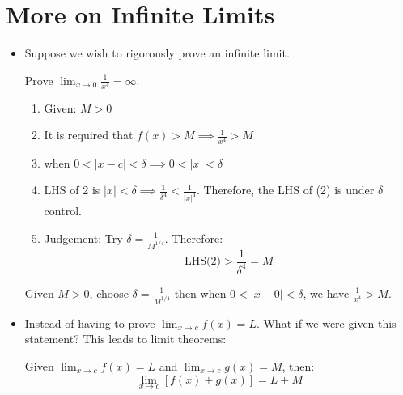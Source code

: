 \section{More on Infinite Limits}
\begin{itemize}
    \item Suppose we wish to rigorously prove an infinite limit.
    \begin{example}
        Prove $\displaystyle\lim_{x\to 0}\frac{1}{x^4}=\infty$.
        \begin{enumerate}
            \item Given: $M>0$
            \item It is required that $f(x)>M \implies \frac{1}{x^4} > M$
            \item when $0<|x-c|<\delta \implies 0<|x|<\delta$
            \item LHS of 2 is $|x|<\delta \implies \frac{1}{\delta^4} < \frac{1}{|x|^4}$. Therefore, the LHS of (2) is under $\delta$ control.
            \item Judgement: Try $\delta=\frac{1}{M^{1/4}}$. Therefore:
            \begin{equation}
                \text{LHS(2)} > \frac{1}{\delta^4} = M
                \label{eq:}
            \end{equation}
        \end{enumerate}
        Given $M>0$, choose $\delta=\frac{1}{M^{1/4}}$ then when $0<|x-0|<\delta$, we have $\frac{1}{x^4}>M$.
    \end{example}
    \item Instead of having to prove $\displaystyle \lim_{x\to c} f(x)=L$. What if we were given this statement? This leads to limit theorems:
    \begin{theorem}
        Given $\displaystyle\lim_{x\to c}f(x)=L$ and $\displaystyle\lim_{x\to c}g(x)=M$, then:
        \begin{equation}
            \lim_{x\to c}\left[f(x)+g(x)\right]=L+M
            \label{eq:}
        \end{equation}
        

\end{theorem}
\end{itemize}
